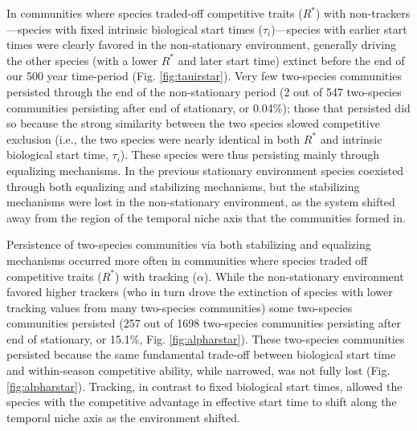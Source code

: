\documentclass[11pt,letterpaper]{article}
\begin{document}
In communities where species traded-off competitive traits ($R^*$) with non-trackers---species with fixed intrinsic biological start times ($\tau_i$)---species with earlier start times were clearly favored in the non-stationary environment, generally driving the other species (with a lower $R^*$ and later start time) extinct before the end of our 500 year time-period (Fig. \ref{fig:tauirstar}). Very few two-species communities persisted through the end of the non-stationary period (2 out of 547 two-species communities persisting after end of stationary, or 0.04\%); those that persisted did so because the strong similarity between the two species slowed competitive exclusion (i.e., the two species were nearly identical in both $R^*$ and intrinsic biological start time, $\tau_i$). These species were thus persisting mainly through equalizing mechanisms. In the previous stationary environment species coexisted through both equalizing and stabilizing mechanisms, but the stabilizing mechanisms were lost in the non-stationary environment, as the system shifted away from the region of the temporal niche axis that the communities formed in. 

Persistence of two-species communities via both stabilizing and equalizing mechanisms occurred more often in communities where species traded off competitive traits ($R^*$) with tracking ($\alpha$). While the non-stationary environment favored higher trackers (who in turn drove the extinction of species with lower tracking values from many two-species communities) some two-species communities persisted (257 out of 1698 two-species communities persisting after end of stationary, or 15.1\%, Fig. \ref{fig:alpharstar}). These two-species communities persisted because the same fundamental trade-off between biological start time and within-season competitive ability, while narrowed, was not fully lost (Fig. \ref{fig:alpharstar}). Tracking, in contrast to fixed biological start times, allowed the species with the competitive advantage in effective start time to shift along the temporal niche axis as the environment shifted.  
\end{document}
